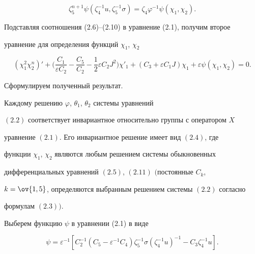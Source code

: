 \begin{equation} 


\zeta^{n+1}_5\psi(\zeta^{-1}_4u,\zeta^{-1}_5\sigma)= 


\zeta_4\varphi^{-1}\psi(\chi_1,\chi_2).\tag{2.10} 


\end{equation} 


Подставляя соотношения (2.6)--(2.10) в уравнение (2.1), получим второе 


уравнение для определения функций $\chi_1$, $\chi_2$ 


\begin{equation} 


(\chi^2_1\chi^n_2)'+\bigg(\frac{C_1}{\varepsilon C_2}- 


\frac{C_5}{C_2}-\frac{1}{2}\varepsilon C_2J^2 \bigg)\chi'_1+ 


(C_3+\varepsilon C_1J)\chi_1+\varepsilon\psi(\chi_1,\chi_2)=0. 


\tag{2.11} 


\end{equation} 


 


Сформулируем полученный результат. 


 


\begin{thm} 


Каждому решению $\varphi$, $\theta_1$, $\theta_2$ системы уравнений 


$(2.2)$ соответствует инвариантное относительно группы с оператором $X$ 


уравнение $(2.1)$. Его инвариантное решение имеет вид $(2.4)$, где 


функции $\chi_1$, $\chi_2$ являются любым решением системы обыкновенных 


дифференциальных уравнений $(2.5)$, $(2.11)$ $($постоянные $C_k$, 


$k=\ov{1,5}$, определяются выбранным решением системы $(2.2)$ согласно 


формулам $(2.3))$. 


\end{thm} 


 


Выберем функцию $\psi$ в уравнении (2.1) в виде 


\begin{equation} 


\psi=\varepsilon^{-1}[C^{-1}_2(C_5-\varepsilon^{-1}C_4)\zeta^{-1}_5 


\sigma(\zeta^{-1}_4u)^{-1}-C_3\zeta^{-1}_4u].\tag{2.12} 


\end{equation} 


